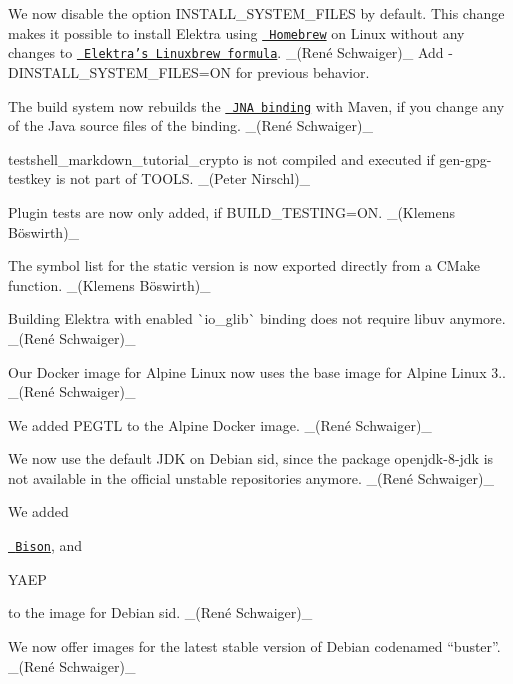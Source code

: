\begin{DoxyItemize}
\item We now disable the option {\ttfamily I\+N\+S\+T\+A\+L\+L\+\_\+\+S\+Y\+S\+T\+E\+M\+\_\+\+F\+I\+L\+ES} by default. This change makes it possible to install Elektra using \href{https://brew.sh}{\texttt{ Homebrew}} on Linux without any changes to \href{https://github.com/Homebrew/linuxbrew-core/blob/master/Formula/elektra.rb}{\texttt{ Elektra’s Linuxbrew formula}}. \+\_\+(René Schwaiger)\+\_\+ Add {\ttfamily -\/D\+I\+N\+S\+T\+A\+L\+L\+\_\+\+S\+Y\+S\+T\+E\+M\+\_\+\+F\+I\+L\+ES=ON} for previous behavior.
\item The build system now rebuilds the \href{https://www.libelektra.org/bindings/jna}{\texttt{ J\+NA binding}} with Maven, if you change any of the Java source files of the binding. \+\_\+(René Schwaiger)\+\_\+
\item {\ttfamily testshell\+\_\+markdown\+\_\+tutorial\+\_\+crypto} is not compiled and executed if {\ttfamily gen-\/gpg-\/testkey} is not part of T\+O\+O\+LS. \+\_\+(\+Peter Nirschl)\+\_\+
\item Plugin tests are now only added, if {\ttfamily B\+U\+I\+L\+D\+\_\+\+T\+E\+S\+T\+I\+NG=ON}. \+\_\+(Klemens Böswirth)\+\_\+
\item The symbol list for the static version is now exported directly from a C\+Make function. \+\_\+(Klemens Böswirth)\+\_\+
\item Building Elektra with enabled \`{}io\+\_\+glib\`{} binding does not require libuv anymore. \+\_\+(René Schwaiger)\+\_\+
\end{DoxyItemize}


\begin{DoxyItemize}
\item Our Docker image for Alpine Linux now uses the base image for Alpine Linux 3.. \+\_\+(René Schwaiger)\+\_\+
\item We added P\+E\+G\+TL to the Alpine Docker image. \+\_\+(René Schwaiger)\+\_\+
\end{DoxyItemize}


\begin{DoxyItemize}
\item We now use the default J\+DK on Debian sid, since the package {\ttfamily openjdk-\/8-\/jdk} is not available in the official unstable repositories anymore. \+\_\+(René Schwaiger)\+\_\+
\item We added
\begin{DoxyItemize}
\item \href{https://www.gnu.org/software/bison/}{\texttt{ Bison}}, and
\item Y\+A\+EP
\end{DoxyItemize}

to the image for Debian sid. \+\_\+(René Schwaiger)\+\_\+
\item We now offer images for the latest stable version of Debian codenamed “buster”. \+\_\+(René Schwaiger)\+\_\+
\end{DoxyItemize}


